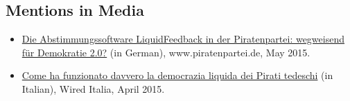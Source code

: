 \documentclass[line,mm]{res}
\newcounter{y}
\newcounter{z}
\begin{document}
\begin{resume}
\section{Mentions in Media}
\begin{itemize}
  \item
    \href{https://www.piratenpartei.de/2015/05/31/die-abstimmungssoftware-liquidfeedback-der-piratenpartei-wegweisend-fuer-demokratie-2-0/}{Die
      Abstimmungssoftware LiquidFeedback in der Piratenpartei:
      wegweisend für Demokratie 2.0?} (in German), www.piratenpartei.de, May 2015. 
\item
  \href{http://www.wired.it/attualita/2015/04/01/come-funzionato-davvero-democrazia-liquida-dei-pirati-tedeschi/}{Come
    ha funzionato davvero la democrazia liquida dei Pirati tedeschi} (in Italian),
  Wired Italia, April 2015. 
\end{itemize}


\end{resume}
\end{document}
